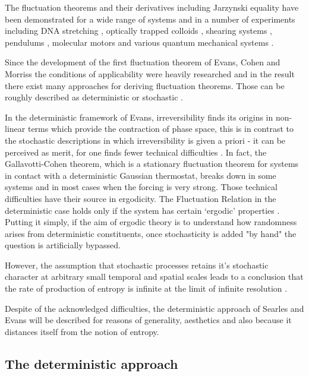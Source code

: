 \documentclass[a4paper,12pt]{article}
\begin{document}
The fluctuation theorems and their derivatives including Jarzynski equality have been demonstrated for a wide range of systems and in a number of experiments including DNA stretching \cite{Collin:2005fx}, optically trapped colloids \cite{Carberry:2007be}, shearing systems \cite{Evans:1993bl}, pendulums \cite{Ciliberto:2010jg}, molecular motors \cite{Seifert:2005it} and various quantum mechanical systems \cite{Monnai:2005ke}.

Since the development of the first fluctuation theorem of Evans, Cohen and Morriss the conditions of applicability were heavily researched and in the result there exist many approaches for deriving fluctuation theorems. 
Those can be roughly described as deterministic \cite{Evans:2002gg, Evans:2241458} or stochastic \cite{Kurchan:1998, Searles:1999fz}.

In the deterministic framework of Evans, irreversibility finds its origins in non-linear terms which provide the contraction of phase space, this is in contrast to the stochastic descriptions in which irreversibility is given a priori - it can be perceived as merit, for one finds fewer technical difficulties \cite{Crooks:2008ta}. 
In fact, the Gallavotti-Cohen theorem, which is a stationary fluctuation theorem for systems in contact with a deterministic Gaussian thermostat, breaks down in some systems and in most cases when the forcing is very strong.  
Those technical difficulties have their source in ergodicity. The Fluctuation Relation in the deterministic case holds only if the system has certain ‘ergodic’ properties \cite{Kurchan:2009ub}. Putting it simply, if the aim of ergodic theory is to understand how randomness arises from deterministic constituents, once stochasticity is added "by hand" the question is artificially bypassed. 

However, the assumption that stochastic processes retains it's stochastic character at arbitrary small temporal and spatial scales leads to a conclusion that the rate of production of entropy is infinite at the limit of infinite resolution \cite{Dorfman:ozm67-zD}.

Despite of the acknowledged difficulties, the deterministic approach of Searles and Evans will be described for reasons of generality, aesthetics and also because it distances itself from the notion of entropy.

\subsection{The deterministic approach}
\end{document}
